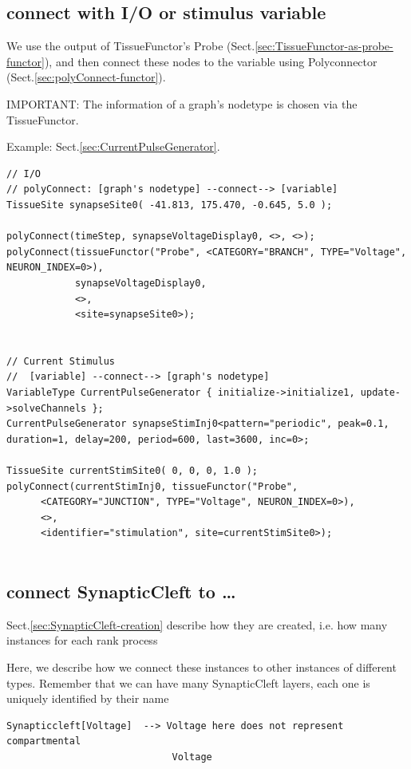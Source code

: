 \subsection{connect with I/O or stimulus variable}


We use the output of TissueFunctor's Probe
(Sect.\ref{sec:TissueFunctor-as-probe-functor}), and then connect these nodes
to the variable using Polyconnector (Sect.\ref{sec:polyConnect-functor}).

IMPORTANT: The information of a graph's nodetype is chosen via the
TissueFunctor.

Example: Sect.\ref{sec:CurrentPulseGenerator}.
\begin{verbatim}
// I/O  
// polyConnect: [graph's nodetype] --connect--> [variable]
TissueSite synapseSite0( -41.813, 175.470, -0.645, 5.0 );

polyConnect(timeStep, synapseVoltageDisplay0, <>, <>);
polyConnect(tissueFunctor("Probe", <CATEGORY="BRANCH", TYPE="Voltage", NEURON_INDEX=0>), 
            synapseVoltageDisplay0, 
            <>, 
            <site=synapseSite0>);
	
	
// Current Stimulus
//  [variable] --connect--> [graph's nodetype]
VariableType CurrentPulseGenerator { initialize->initialize1, update->solveChannels };
CurrentPulseGenerator synapseStimInj0<pattern="periodic", peak=0.1, duration=1, delay=200, period=600, last=3600, inc=0>;

TissueSite currentStimSite0( 0, 0, 0, 1.0 );
polyConnect(currentStimInj0, tissueFunctor("Probe", 
      <CATEGORY="JUNCTION", TYPE="Voltage", NEURON_INDEX=0>), 
      <>,
      <identifier="stimulation", site=currentStimSite0>);
	
\end{verbatim}




\subsection{connect SynapticCleft to \ldots}


Sect.\ref{sec:SynapticCleft-creation} describe how they are created, i.e. how
many instances for each rank process

Here, we describe how we connect these instances to other instances of different
types. Remember that we can have many SynapticCleft layers, each one is uniquely
identified by their name
\begin{verbatim}
Synapticcleft[Voltage]  --> Voltage here does not represent compartmental
                             Voltage
\end{verbatim}


